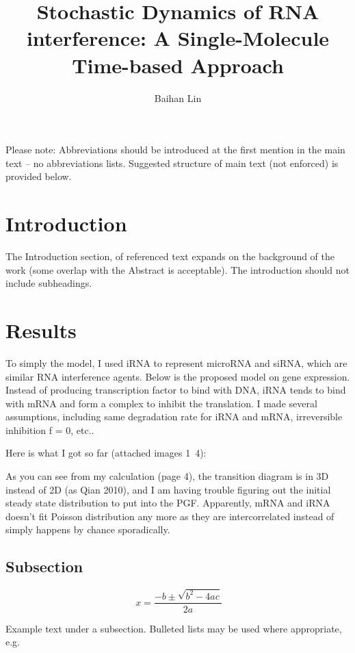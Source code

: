 \documentclass[fleqn,10pt]{wlscirep}
\title{Stochastic Dynamics of RNA interference: A Single-Molecule Time-based Approach}
\author[1*]{Baihan Lin}
\affil[1]{Department of Applied Mathematics, University of Washington, Seattle, WA 98195, USA}
\affil[*]{doerlbh@gmail.com}
\begin{document}
\flushbottom
\maketitle
\thispagestyle{empty}

\noindent Please note: Abbreviations should be introduced at the first mention in the main text – no abbreviations lists. Suggested structure of main text (not enforced) is provided below.

\section*{Introduction}

The Introduction section, of referenced text\cite{Figueredo:2009dg} expands on the background of the work (some overlap with the Abstract is acceptable). The introduction should not include subheadings.

\section*{Results}

To simply the model, I used iRNA to represent microRNA and siRNA, which are similar RNA interference agents. Below is the proposed model on gene expression. Instead of producing transcription factor to bind with DNA, iRNA tends to bind with mRNA and form a complex to inhibit the translation. I made several assumptions, including same degradation rate for iRNA and mRNA, irreversible inhibition f = 0, etc..
 
Here is what I got so far (attached images 1~4):
 
As you can see from my calculation (page 4), the transition diagram is in 3D instead of 2D (as Qian 2010), and I am having trouble figuring out the initial steady state distribution to put into the PGF. Apparently, mRNA and iRNA doesn’t fit Poisson distribution any more as they are intercorrelated instead of simply happens by chance sporadically.




\subsection*{Subsection}

\begin{equation}
\ x=\frac{-b\pm\sqrt{b^2-4ac}}{2a}
\end{equation}




Example text under a subsection. Bulleted lists may be used where appropriate, e.g.
\end{document}

